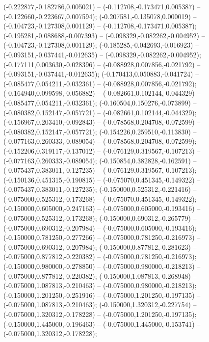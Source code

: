  (-0.222877,-0.182786,0.005021) -- (-0.112708,-0.173471,0.005387) -- (-0.122660,-0.223667,0.007594);
 (-0.207581,-0.135078,0.000019) -- (-0.104723,-0.127308,0.001129) -- (-0.112708,-0.173471,0.005387);
 (-0.195281,-0.088688,-0.007393) -- (-0.098329,-0.082262,-0.004952) -- (-0.104723,-0.127308,0.001129);
 (-0.185285,-0.042693,-0.016923) -- (-0.093151,-0.037441,-0.012635) -- (-0.098329,-0.082262,-0.004952);
 (-0.177111,0.003630,-0.028396) -- (-0.088928,0.007856,-0.021792) -- (-0.093151,-0.037441,-0.012635);
 (-0.170413,0.050883,-0.041724) -- (-0.085477,0.054211,-0.032361) -- (-0.088928,0.007856,-0.021792);
 (-0.164940,0.099598,-0.056882) -- (-0.082661,0.102144,-0.044329) -- (-0.085477,0.054211,-0.032361);
 (-0.160504,0.150276,-0.073899) -- (-0.080382,0.152147,-0.057721) -- (-0.082661,0.102144,-0.044329);
 (-0.156967,0.203410,-0.092843) -- (-0.078568,0.204708,-0.072599) -- (-0.080382,0.152147,-0.057721);
 (-0.154226,0.259510,-0.113830) -- (-0.077163,0.260333,-0.089054) -- (-0.078568,0.204708,-0.072599);
 (-0.152206,0.319117,-0.137012) -- (-0.076129,0.319567,-0.107213) -- (-0.077163,0.260333,-0.089054);
 (-0.150854,0.382828,-0.162591) -- (-0.075437,0.383011,-0.127235) -- (-0.076129,0.319567,-0.107213);
 (-0.150136,0.451315,-0.190815) -- (-0.075070,0.451345,-0.149322) -- (-0.075437,0.383011,-0.127235);
 (-0.150000,0.525312,-0.221416) -- (-0.075000,0.525312,-0.173268) -- (-0.075070,0.451345,-0.149322);
 (-0.150000,0.605000,-0.247163) -- (-0.075000,0.605000,-0.193416) -- (-0.075000,0.525312,-0.173268);
 (-0.150000,0.690312,-0.265779) -- (-0.075000,0.690312,-0.207984) -- (-0.075000,0.605000,-0.193416);
 (-0.150000,0.781250,-0.277266) -- (-0.075000,0.781250,-0.216973) -- (-0.075000,0.690312,-0.207984);
 (-0.150000,0.877812,-0.281623) -- (-0.075000,0.877812,-0.220382) -- (-0.075000,0.781250,-0.216973);
 (-0.150000,0.980000,-0.278850) -- (-0.075000,0.980000,-0.218213) -- (-0.075000,0.877812,-0.220382);
 (-0.150000,1.087813,-0.268948) -- (-0.075000,1.087813,-0.210463) -- (-0.075000,0.980000,-0.218213);
 (-0.150000,1.201250,-0.251916) -- (-0.075000,1.201250,-0.197135) -- (-0.075000,1.087813,-0.210463);
 (-0.150000,1.320312,-0.227754) -- (-0.075000,1.320312,-0.178228) -- (-0.075000,1.201250,-0.197135);
 (-0.150000,1.445000,-0.196463) -- (-0.075000,1.445000,-0.153741) -- (-0.075000,1.320312,-0.178228);
